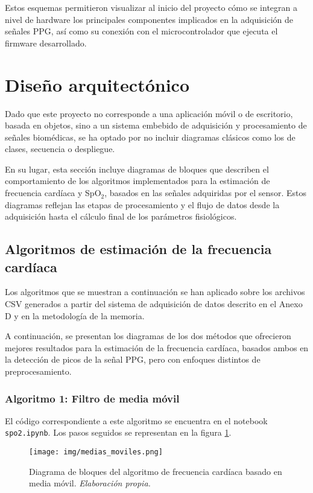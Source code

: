 Estos esquemas permitieron visualizar al inicio del proyecto cómo se integran a nivel de hardware los principales componentes implicados en la adquisición de señales PPG, así como su conexión con el microcontrolador que ejecuta el firmware desarrollado. 


\section{Diseño arquitectónico}

Dado que este proyecto no corresponde a una aplicación móvil o de escritorio, basada en objetos, sino a un sistema embebido de adquisición y procesamiento de señales biomédicas, se ha optado por no incluir diagramas clásicos como los de clases, secuencia o despliegue.

En su lugar, esta sección incluye diagramas de bloques que describen el comportamiento de los algoritmos implementados para la estimación de frecuencia cardíaca y SpO$_2$, basados en las señales adquiridas por el sensor. Estos diagramas reflejan las etapas de procesamiento y el flujo de datos desde la adquisición hasta el cálculo final de los parámetros fisiológicos.

\subsection{Algoritmos de estimación de la frecuencia cardíaca}

Los algoritmos que se muestran a continuación se han aplicado sobre los archivos CSV generados a partir del sistema de adquisición de datos descrito en el Anexo D y en la metodología de la memoria.

A continuación, se presentan los diagramas de los dos métodos que ofrecieron mejores resultados para la estimación de la frecuencia cardíaca, basados ambos en la detección de picos de la señal PPG, pero con enfoques distintos de preprocesamiento.

\subsubsection{Algoritmo 1: Filtro de media móvil}

El código correspondiente a este algoritmo se encuentra en el notebook \texttt{spo2.ipynb}. Los pasos seguidos se representan en la figura \ref{fig: diagrama1}.

\begin{figure}[H]
    \centering
    \texttt{[image: img/medias\_moviles.png]}
    \caption{Diagrama de bloques del algoritmo de frecuencia cardíaca basado en media móvil. \textit{Elaboración propia.}}
    \label{fig: diagrama1}
\end{figure}

